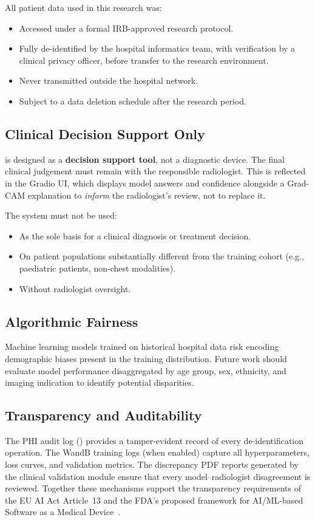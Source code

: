 All patient data used in this research was:
\begin{itemize}
  \item Accessed under a formal IRB-approved research protocol.
  \item Fully de-identified by the hospital informatics team, with
        verification by a clinical privacy officer, before transfer
        to the research environment.
  \item Never transmitted outside the hospital network.
  \item Subject to a data deletion schedule after the research period.
\end{itemize}

\subsection{Clinical Decision Support Only}
\label{subsec:decision_support}

\medxplain{} is designed as a \textbf{decision support tool}, not a
diagnostic device. The final clinical judgement must remain with the
responsible radiologist. This is reflected in the Gradio UI, which
displays model answers and confidence alongside a Grad-CAM explanation
to \emph{inform} the radiologist's review, not to replace it.

The system must not be used:
\begin{itemize}
  \item As the sole basis for a clinical diagnosis or treatment decision.
  \item On patient populations substantially different from the training
        cohort (e.g., paediatric patients, non-chest modalities).
  \item Without radiologist oversight.
\end{itemize}

\subsection{Algorithmic Fairness}
\label{subsec:fairness}

Machine learning models trained on historical hospital data risk encoding
demographic biases present in the training distribution. Future work should
evaluate model performance disaggregated by age group, sex, ethnicity, and
imaging indication to identify potential disparities.

\subsection{Transparency and Auditability}
\label{subsec:transparency}

The PHI audit log () provides a tamper-evident record
of every de-identification operation. The WandB training logs (when enabled)
capture all hyperparameters, loss curves, and validation metrics.
The discrepancy PDF reports generated by the clinical validation module
ensure that every model--radiologist disagreement is reviewed.
Together these mechanisms support the transparency requirements of the
EU AI Act Article~13 and the FDA's proposed framework for AI/ML-based
Software as a Medical Device~\citep{fda2021ai}.
